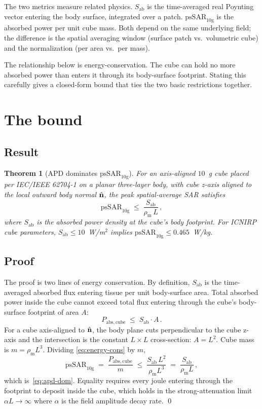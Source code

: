 \documentclass[11pt,a4paper]{article}
\newtheorem{theorem}{Theorem}
\theoremstyle{definition}
\theoremstyle{remark}
\newcommand{\APD}{S_{\mathrm{ab}}}
\newcommand{\nhat}{\hat{\vb{n}}}
\newcommand{\psSAR}{\ensuremath{\mathrm{psSAR}_{10\mathrm{g}}}}
\newcommand{\rhom}{\rho_{\mathrm{m}}}
\begin{document}
The two metrics measure related physics. $\APD$ is the time-averaged
real Poynting vector entering the body surface, integrated over a
patch. $\psSAR$ is the absorbed power per unit cube mass. Both depend on
the same underlying field; the difference is the spatial averaging
window (surface patch vs.\ volumetric cube) and the normalization
(per area vs.\ per mass).

The relationship below is energy-conservation. The cube can hold no
more absorbed power than enters it through its body-surface footprint.
Stating this carefully gives a closed-form bound that ties the two
basic restrictions together.

\section{The bound}\label{sec:bound}

\subsection{Result}

\begin{theorem}[APD dominates $\psSAR$]\label{thm:apd-dom}
For an axis-aligned $10$~g cube placed per IEC/IEEE 62704-1 on a planar
three-layer body, with cube z-axis aligned to the local outward body
normal $\nhat$, the peak spatial-average SAR satisfies
\begin{equation}\label{eq:apd-dom}
  \psSAR \;\le\; \frac{\APD}{\rhom\,L}\, ,
\end{equation}
where $\APD$ is the absorbed power density at the cube's body footprint.
For ICNIRP cube parameters, $\APD \le 10$~W/m$^2$ implies
$\psSAR \le 0.465$~W/kg.
\end{theorem}

\subsection{Proof}

The proof is two lines of energy conservation. By definition, $\APD$
is the time-averaged absorbed flux entering tissue per unit body-surface
area. Total absorbed power inside the cube cannot exceed total flux
entering through the cube's body-surface footprint of area $A$:
\begin{equation}\label{eq:energy-cons}
  P_{\mathrm{abs, cube}} \;\le\; \APD \cdot A\, .
\end{equation}
For a cube axis-aligned to $\nhat$, the body plane cuts perpendicular to
the cube z-axis and the intersection is the constant $L \times L$
cross-section: $A = L^2$. Cube mass is $m = \rhom L^3$. Dividing
\cref{eq:energy-cons} by $m$,
\begin{equation}
  \psSAR \;=\; \frac{P_{\mathrm{abs, cube}}}{m}
  \;\le\; \frac{\APD\,L^2}{\rhom L^3}
  \;=\; \frac{\APD}{\rhom L}\, ,
\end{equation}
which is~\cref{eq:apd-dom}. Equality requires every joule entering
through the footprint to deposit inside the cube, which holds in the
strong-attenuation limit $\alpha L \to \infty$ where $\alpha$ is the
field amplitude decay rate. \qed
\end{document}
